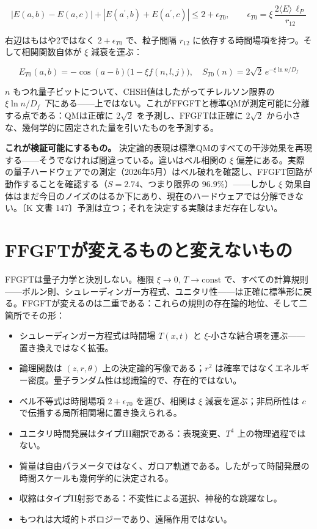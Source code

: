 \documentclass[11pt,openany]{book}
\begin{document}
\[|E(a,b)-E(a,c)| + |E(a^\prime,b)+E(a^\prime,c)| \leq 2 + \epsilon_{T0},\qquad\epsilon_{T0} = \xi\,\frac{2\langle E\rangle\,\ell_P}{r_{12}}\]

右辺はもはや2ではなく $2+\epsilon_{T0}$ で、粒子間隔 $r_{12}$ に依存する時間場項を持つ。そして相関関数自体が $\xi$ 減衰を運ぶ：

\[E_{T0}(a,b) = -\cos(a-b)\bigl(1-\xi f(n,l,j)\bigr),\quad S_{T0}(n) = 2\sqrt{2}\,e^{-\xi\ln n/D_f}\]

$n$ もつれ量子ビットについて、CHSH値はしたがってチレルソン限界の $\xi\ln n/D_f$ \textit{下}にある——上ではない。これがFFGFTと標準QMが測定可能に分離する点である：QMは正確に $2\sqrt{2}$ を予測し、FFGFTは正確に $2\sqrt{2}$ から小さな、幾何学的に固定された量を引いたものを予測する。

\textbf{これが検証可能にするもの。} 決定論的表現は標準QMのすべての干渉効果を再現する——そうでなければ間違っている。違いはベル相関の $\xi$ 偏差にある。実際の量子ハードウェアでの測定（2026年5月）はベル破れを確認し、FFGFT回路が動作することを確認する（$S = 2.74$、つまり限界の $96.9\%$）——しかし $\xi$ 効果自体はまだ今日のノイズのはるか下にあり、現在のハードウェアでは分解できない。〔K 文書 147〕予測は立つ；それを決定する実験はまだ存在しない。

\section*{FFGFTが変えるものと変えないもの}

FFGFTは量子力学と決別しない。極限 $\xi \to 0$, $T \to \mathrm{const}$ で、すべての計算規則——ボルン則、シュレーディンガー方程式、ユニタリ性——は正確に標準形に戻る。FFGFTが変えるのは二重である：これらの規則の存在論的地位、そして二箇所でその形：

\begin{itemize}
\item シュレーディンガー方程式は時間場 $T(x,t)$ と $\xi$-小さな結合項を運ぶ——置き換えではなく拡張。
\item 論理関数は $(z,r,\theta)$ 上の決定論的写像である；$r^2$ は確率ではなくエネルギー密度。量子ランダム性は認識論的で、存在的ではない。
\item ベル不等式は時間場項 $2+\epsilon_{T0}$ を運び、相関は $\xi$ 減衰を運ぶ；非局所性は $c$ で伝播する局所相関場に置き換えられる。
\item ユニタリ時間発展はタイプIII翻訳である：表現変更、$T^4$ 上の物理過程ではない。
\item 質量は自由パラメータではなく、ガロア軌道である。したがって時間発展の時間スケールも幾何学的に決定される。
\item 収縮はタイプII射影である：不変性による選択、神秘的な跳躍なし。
\end{itemize}
\begin{itemize}
\item もつれは大域的トポロジーであり、遠隔作用ではない。
\end{itemize}
\end{document}
